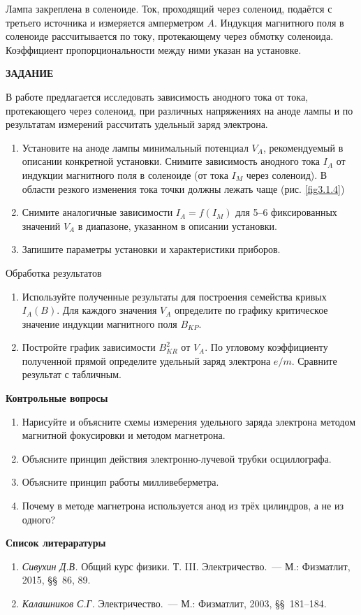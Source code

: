 Лампа закреплена в соленоиде. Ток, проходящий через соленоид, подаётся с третьего источника и измеряется амперметром $A$.
Индукция магнитного поля в соленоиде рассчитывается по току, протекающему через обмотку соленоида. Коэффициент
пропорциональности между ними указан на установке.

{\Large \bf ЗАДАНИЕ}

В работе предлагается исследовать зависимость анодного тока от тока, протекающего через соленоид, при различных
напряжениях на аноде лампы и по результатам измерений рассчитать удельный заряд электрона.

\begin{enumerate}
\item{ Установите на аноде лампы минимальный потенциал $V_A$, рекомендуемый в описании конкретной установки. Снимите зависимость анодного тока $I_A$ от индукции магнитного поля в соленоиде (от тока $I_{M}$ через соленоид). В области резкого изменения тока точки должны лежать чаще (рис. \ref{fig3.1.4})}
\item{ Снимите аналогичные зависимости $I_A=f(I_M)$ для 5--6 фиксированных значений $V_A$ в диапазоне, указанном в описании установки.}

\item{ Запишите параметры установки и характеристики приборов.}
\end{enumerate}

{\rm Обработка результатов}
\begin{enumerate}
\item{Используйте полученные результаты для построения семейства кривых $I_{A}(B)$. Для каждого значения $V_A$ определите по графику критическое значение индукции магнитного поля $B_{KP}$}.
\item Постройте  график зависимости $B_{KR}^2$ от $V_A$. По угловому коэффициенту полученной прямой определите удельный заряд электрона $e/m$. Сравните результат с табличным.
\end{enumerate}

{ \small
{\bf \Large Контрольные вопросы}

\begin{enumerate}
\item{ Нарисуйте и объясните схемы измерения удельного заряда электрона методом магнитной фокусировки и методом магнетрона.}
\item{Объясните принцип действия электронно-лучевой трубки осциллографа.}
\item{ Объясните принцип работы милливеберметра.}
\item{ Почему в методе магнетрона используется анод из трёх цилиндров, а не из одного?}
\end{enumerate}

{\bf \Large Список литераратуры}
\begin{enumerate}
\item{ {\em Сивухин Д.В.} Общий курс физики. Т. III. Электричество.~--- М.: Физматлит, 2015, \S\S~86, 89.}
\item{ {\em Калашников С.Г.} Электричество.~--- М.: Физматлит, 2003, \S\S~181--184.}
\end{enumerate}
}




